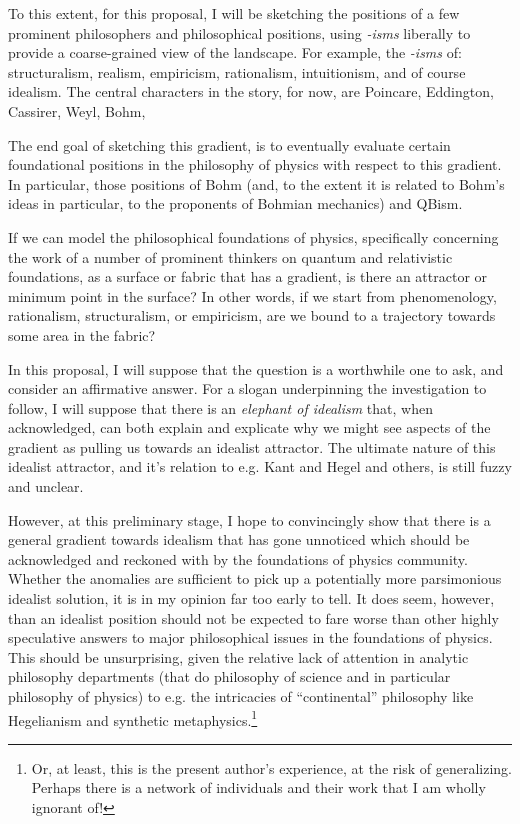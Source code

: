 To this extent, for this proposal, I will be sketching the positions of a few prominent philosophers and philosophical positions, using \emph{-isms} liberally to provide a coarse-grained view of the landscape.  For example, the \emph{-isms} of: structuralism, realism, empiricism, rationalism, intuitionism, and of course idealism.  The central characters in the story, for now, are Poincare, Eddington, Cassirer, Weyl, Bohm, 

The end goal of sketching this gradient, is to eventually evaluate certain foundational positions in the philosophy of physics with respect to this gradient.  In particular, those positions of Bohm (and, to the extent it is related to Bohm's ideas in particular, to the proponents of Bohmian mechanics) and QBism.  


If we can model the philosophical foundations of physics, specifically concerning the work of a number of prominent thinkers on quantum and relativistic foundations, as a surface or fabric that has a gradient, is there an attractor or minimum point in the surface?  In other words, if we start from phenomenology, rationalism, structuralism, or empiricism, are we bound to a trajectory towards some area in the fabric?  

In this proposal, I will suppose that the question is a worthwhile one to ask, and consider an affirmative answer.  For a slogan underpinning the investigation to follow, I will suppose that there is an \emph{elephant of idealism} that, when acknowledged, can both explain and explicate why we might see aspects of the gradient as pulling us towards an idealist attractor.  The ultimate nature of this idealist attractor, and it's relation to e.g. Kant and Hegel and others, is still fuzzy and unclear.  

However, at this preliminary stage, I hope to convincingly show that there is a general gradient towards idealism that has gone unnoticed which should be acknowledged and reckoned with by the foundations of physics community.  Whether the anomalies are sufficient to pick up a potentially more parsimonious idealist solution, it is in my opinion far too early to tell.  It does seem, however, than an idealist position should not be expected to fare worse than other highly speculative answers to major philosophical issues in the foundations of physics.  This should be unsurprising, given the relative lack of attention in analytic philosophy departments (that do philosophy of science and in particular philosophy of physics) to e.g. the intricacies of ``continental'' philosophy like Hegelianism and synthetic metaphysics.\footnote{Or, at least, this is the present author's experience, at the risk of generalizing.  Perhaps there is a network of individuals and their work that I am wholly ignorant of!}


